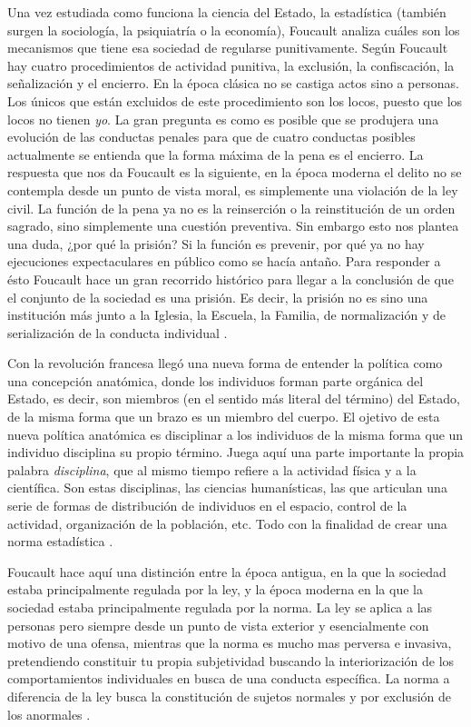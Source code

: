 \documentclass[11pt]{article}
\begin{document}
Una vez estudiada como funciona la ciencia del Estado, la estadística (también surgen la sociología, la psiquiatría o la economía), Foucault analiza cuáles son los mecanismos que tiene esa sociedad de regularse punitivamente. Según Foucault hay cuatro procedimientos de actividad punitiva, la exclusión, la confiscación, la señalización y el encierro. En la época clásica no se castiga actos sino a personas. Los únicos que están excluidos de este procedimiento son los locos, puesto que los locos no tienen \textit{yo}. La gran pregunta es como es posible que se produjera una evolución de las conductas penales para que de cuatro conductas posibles actualmente se entienda que la forma máxima de la pena es el encierro. La respuesta que nos da Foucault es la siguiente, en la época moderna el delito no se contempla desde un punto de vista moral, es simplemente una violación de la ley civil. La función de la pena ya no es la reinserción o la reinstitución de un orden sagrado, sino simplemente una cuestión preventiva. Sin embargo esto nos plantea una duda, ¿por qué la prisión? Si la función es prevenir, por qué ya no hay ejecuciones expectaculares en público como se hacía antaño. Para responder a ésto Foucault hace un gran recorrido histórico para llegar a la conclusión de que el conjunto de la sociedad es una prisión. Es decir, la prisión no es sino una institución más junto a la Iglesia, la Escuela, la Familia, de normalización y de serialización de la conducta individual \cite{ernesto-foucault}.

Con la revolución francesa llegó una nueva forma de entender la política como una concepción anatómica, donde los individuos forman parte orgánica del Estado, es decir, son miembros (en el sentido más literal del término) del Estado, de la misma forma que un brazo es un miembro del cuerpo. El ojetivo de esta nueva política anatómica es disciplinar a los individuos de la misma forma que un individuo disciplina su propio término. Juega aquí una parte importante la propia palabra \textit{disciplina}, que al mismo tiempo refiere a la actividad física y a la científica. Son estas disciplinas, las ciencias humanísticas, las que articulan una serie de formas de distribución de individuos en el espacio, control de la actividad, organización de la población, etc. Todo con la finalidad de crear una norma estadística \cite{ernesto-foucault}.

Foucault hace aquí una distinción entre la época antigua, en la que la sociedad estaba principalmente regulada por la ley, y la época moderna en la que la sociedad estaba principalmente regulada por la norma. La ley se aplica a las personas pero siempre desde un punto de vista exterior y esencialmente con motivo de una ofensa, mientras que la norma es mucho mas perversa e invasiva, pretendiendo constituir tu propia subjetividad buscando la interiorización de los comportamientos individuales en busca de una conducta específica. La norma a diferencia de la ley busca la constitución de sujetos normales y por exclusión de los anormales \cite{ernesto-foucault}.
\end{document}
